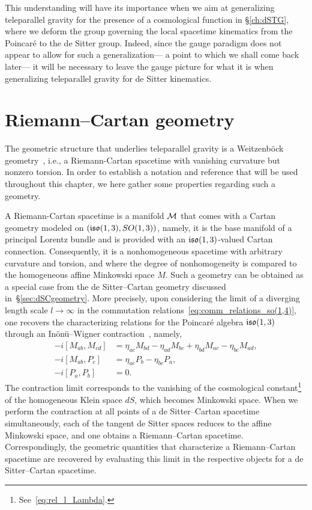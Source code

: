 \documentclass[
final,
11pt,
a4paper,
DIV=11,
headinclude=true,
footinclude=false,
bibliography=totoc,
twoside=true,  %
BCOR=5mm
]{scrbook}
\begin{document}
This understanding will have its importance when we aim at 
generalizing teleparallel gravity for the presence of 
a cosmological function in \S\ref{ch:dSTG}, where we deform the 
group governing the local spacetime kinematics from the 
Poincar\'e to the de Sitter group. Indeed, since the gauge 
paradigm does not appear to allow for such a generalization--- 
a point to which we shall come back later--- it will be necessary 
to leave the gauge picture for what it is when generalizing 
teleparallel gravity for de Sitter kinematics.

\section{Riemann--Cartan geometry}
\label{sec:RC_geometry}

The geometric structure that underlies teleparallel gravity is 
a Weitzenb\"ock geometry~\cite{Weitz:1923it}, i.e., 
a Riemann-Cartan spacetime with vanishing curvature but nonzero 
torsion. In order to establish a notation and reference that will 
be used throughout this chapter, we here gather some properties 
regarding such a geometry.

A Riemann-Cartan spacetime is a manifold $\mathcal{M}$ that comes with 
a Cartan geometry modeled on $(\mathfrak{iso}(1,3), SO(1,3))$, namely, 
it is the base manifold of a principal Lorentz bundle and is 
provided with an $\mathfrak{iso}(1,3)$-valued Cartan connection.  
Consequently, it is a nonhomogeneous spacetime with arbitrary 
curvature and torsion, and where the degree of nonhomogeneity is 
compared to the homogeneous affine Minkowski space $M$.  Such 
a geometry can be obtained as a special case from the de 
Sitter--Cartan geometry discussed in~\S\ref{sec:dSCgeometry}.  
More precisely, upon considering the limit of a diverging length 
scale $l \to \infty$ in the commutation 
relations~\eqref{eq:comm_relations_so(1,4)}, one recovers the 
characterizing relations for the Poincar\'e algebra 
$\mathfrak{iso}(1,3)$ through an In\"on\"u--Wigner 
contraction~\cite{Inonu:1953sp, Gilmore:2002Lg}, namely,
\begin{subequations}
\label{eq:comm_relations_iso(1,3)}
\begin{align}
  -i[M_{ab},M_{cd}] &= \eta_{ac}M_{bd} - \eta_{ad}M_{bc} + 
  \eta_{bd}M_{ac} - \eta_{bc}M_{ad}, \\
  -i[M_{ab},P_c] &= \eta_{ac}P_b- \eta_{bc}P_a, \\
  -i[P_a,P_b] &= 0.
\end{align}
\end{subequations}
The contraction limit corresponds to the vanishing of the 
cosmological constant\footnote{See~\eqref{eq:rel_l_Lambda}.} of 
the homogeneous Klein space $dS$, which becomes Minkowski space.  
When we perform the contraction at all points of a de 
Sitter--Cartan spacetime simultaneously, each of the tangent de 
Sitter spaces reduces to the affine Minkowski space, and one 
obtains a Riemann--Cartan spacetime. Correspondingly, the 
geometric quantities that characterize a Riemann--Cartan 
spacetime are recovered by evaluating this limit in the 
respective objects for a de Sitter--Cartan spacetime.
\end{document}
